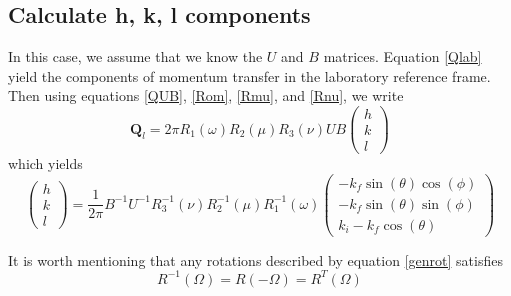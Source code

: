 \documentclass[prb]{revtex4}%
\begin{document}
\subsection{Calculate h, k, l components}

In this case, we assume that we know the $U$ and $B$ matrices. Equation \ref{Qlab}
yield the components of momentum transfer in the laboratory reference frame. Then using
equations \ref{QUB}, \ref{Rom}, \ref{Rmu}, and \ref{Rnu}, we write
\begin{equation}
  \textbf{Q}_l = 2 \pi R_1(\omega) R_2(\mu) R_3(\nu)  U  B \left(\begin{array}{c}
                                                            h \\
                                                            k \\
                                                            l
                                                          \end{array}\right)
\end{equation}
which yields
\begin{equation}\label{getHKL}
  \left(\begin{array}{c}
                                                            h \\
                                                            k \\
                                                            l
                                                          \end{array}\right) =
     \frac{1}{2 \pi}  B^{-1} U^{-1} R_3^{-1}(\nu) R_2^{-1}(\mu) R_1^{-1}(\omega)
     \left(\begin{array}{c}
                                                            -k_f\sin(\theta)\cos(\phi) \\
                                                            -k_f\sin(\theta)\sin(\phi) \\
                                                            k_i-k_f\cos(\theta)
                                                          \end{array}\right)
\end{equation}

It is worth mentioning that any rotations described by equation \ref{genrot} satisfies
\begin{equation}\label{rotinv}
    R^{-1}(\Omega) = R(-\Omega) = R^{T}(\Omega)
\end{equation}
\end{document}
